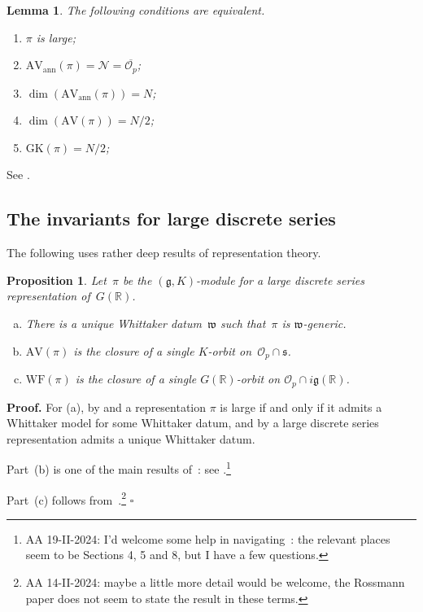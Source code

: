 \documentclass[10pt,leqno]{article}
\newtheorem{lemma}[equation]{Lemma}
\newtheorem{proposition}[equation]{Proposition}
\newcommand{\qed}{\hfill $\square$ \medskip}
\newenvironment{proof}[1][Proof]{\noindent\textbf{#1.} }{\qed}
\renewcommand{\O}{\mathcal O}
\newcommand{\R}{\mathbb R}
\newcommand{\N}{\mathcal N}
\newcommand{\g}{\mathfrak g}
\newcommand{\AV}{\mathrm{AV}}
\newcommand{\WF}{\mathrm{WF}}
\newcommand{\AVann}{\mathrm{AV}_{\mathrm{ann}}}
\newcommand{\GK}{\mathrm{GK}}
\newcommand{\Op}{\O_p}
\begin{document}
\begin{lemma}
  \label{l:large}
  The following conditions are equivalent.
  \begin{enumerate}
    \item $\pi$ is large;
\item $\AVann(\pi)=\N=\overline{\Op}$;
\item $\dim(\AVann(\pi))=N$;
  \item $\dim(\AV(\pi))=N/2$;
\item $\GK(\pi)=N/2$;

\end{enumerate}
\end{lemma}
See \cite{vogan_bowdoin}.

\subsection{The invariants for large discrete series} 


The following uses rather deep results of representation theory.

\begin{proposition} \label{invariants_ds}
Let~$\pi$ be the $(\g, K)$-module for a large discrete series representation of~$G(\R)$.  
\begin{enumerate}[(a)]
\item There is a unique Whittaker datum~$\mathfrak{w}$ such that~$\pi$ is $\mathfrak{w}$-generic.
\item $\AV(\pi)$ is the closure of a single $K$-orbit on~$\mathcal{O}_p \cap \mathfrak{s}$.
\item  $\WF(\pi)$ is the closure of a single $G(\R)$-orbit on $\mathcal{O}_p \cap  i \g(\R)$.
\end{enumerate}
\end{proposition}

\begin{proof} For (a), by \cite{vogan-gelfand-kirillov} and \cite{kostant_whittaker}
a representation $\pi$ is large if and only if it admits a Whittaker model for some Whittaker datum,
and by \cite[Lemma 14.14]{abv} a  large discrete series representation admits a unique Whittaker datum.

Part~(b) is one of the main results of~\cite{vogan_bowdoin}: see \cite[Theorem ?]{vogan_bowdoin}.\footnote{AA 19-II-2024: I'd welcome some help in navigating~\cite{vogan_bowdoin}: the relevant places seem to be  Sections 4, 5 and 8, but I have a few questions.}

Part~(c) follows from~\cite{rossmann_limit_orbits}.\footnote{AA 14-II-2024: maybe a little more detail would be welcome, the Rossmann paper does not seem to state the result in these terms.}
\end{proof}
\end{document}
